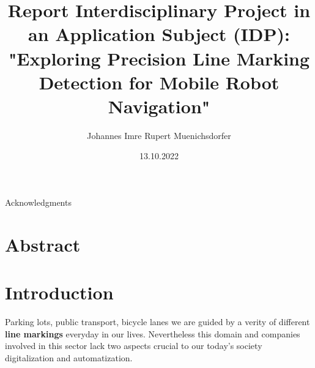 

\renewcommand{\Topic}{IDP Report - Mark Robotics - Precision Line Marking Detection} %


\usepackage{todonotes} %



\title{Report Interdisciplinary Project in an Application Subject (IDP): "Exploring Precision Line Marking Detection for Mobile Robot Navigation"} %
\author{Johannes Imre Rupert Muenichsdorfer} %
\date{13.10.2022} %

\setcounter{page}{3} %

\begin{center}
{\fontsize{18pt}{27pt}\selectfont Acknowledgments}
\end{center}

\tableofcontents %

\chapter{Abstract}
\label{ch:abstract}

\chapter{Introduction}
\label{ch:introduction}

Parking lots, public transport, bicycle lanes \textemdash{} we are guided by a verity of different \textbf{line markings} everyday in our lives. Nevertheless this domain and companies involved in this sector lack two aspects crucial to our today's society \textemdash{} digitalization and automatization. 

